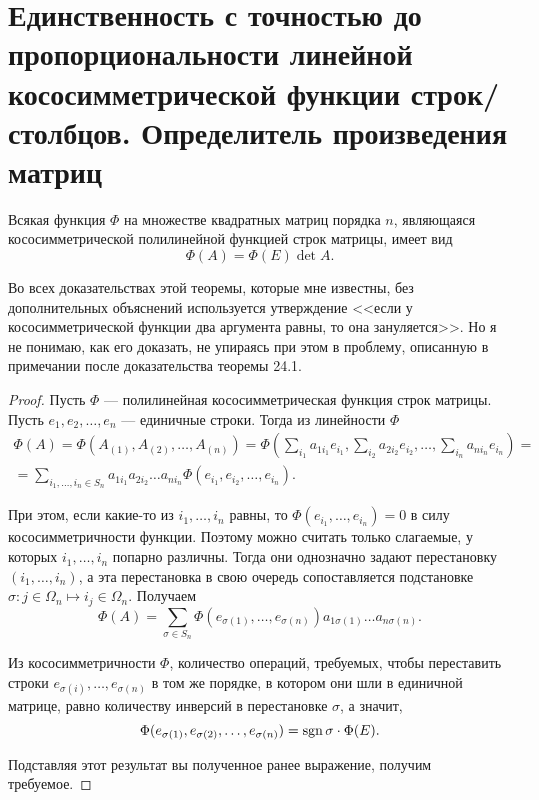 \section{Единственность с точностью до пропорциональности линейной кососимметрической функции строк/столбцов. Определитель произведения матриц}

\begin{theorem}
    Всякая функция $\Phi$ на множестве квадратных матриц порядка $n$, являющаяся кососимметрической полилинейной функцией строк матрицы, имеет вид
    $$
    \Phi(A) = \Phi(E) \det A.
    $$
\end{theorem}

\begin{remark}
    Во всех доказательствах этой теоремы, которые мне известны, без дополнительных объяснений используется утверждение <<если у кососимметрической функции два аргумента равны, то она зануляется>>. Но я не понимаю, как его доказать, не упираясь при этом в проблему, описанную в примечании после доказательства теоремы 24.1.
\end{remark}

\begin{proof}
    Пусть $\Phi$ --- полилинейная кососимметрическая функция строк матрицы. Пусть $e_1, e_2, \ldots, e_n$ --- единичные строки. Тогда из линейности $\Phi$
    $$
    \begin{array}{c}\displaystyle
        \Phi(A) = \Phi(A_{(1)}, A_{(2)}, \ldots, A_{(n)}) = \Phi\left(\sum_{i_1}a_{1 i_1}e_{i_1}, \sum_{i_2}a_{2 i_2}e_{i_2}, \ldots, \sum_{i_n}a_{n i_n}e_{i_n}\right) = {}\\\displaystyle{} = \sum_{i_1, \ldots, i_n \in S_n}a_{1 i_1} a_{2 i_2} \ldots a_{n i_n} \Phi(e_{i_1}, e_{i_2}, \ldots, e_{i_n}).
    \end{array}
    $$

    При этом, если какие-то из $i_1, \ldots, i_n$ равны, то $\Phi(e_{i_1}, \ldots, e_{i_n}) = 0$ в силу кососимметричности функции. Поэтому можно считать только слагаемые, у которых $i_1, \ldots, i_n$ попарно различны. Тогда они однозначно задают перестановку $(i_1, \ldots, i_n)$, а эта перестановка в свою очередь сопоставляется подстановке $\sigma: j \in \Omega_n \mapsto i_j \in \Omega_n$. Получаем
    $$
    \Phi(A) = \sum_{\sigma \in S_n} \Phi(e_{\sigma(1)}, \ldots, e_{\sigma(n)}) a_{1 \sigma(1)} \ldots a_{n \sigma(n)}.
    $$

    Из кососимметричности $\Phi$, количество операций, требуемых, чтобы переставить строки $e_{\sigma(i)}, \ldots, e_{\sigma(n)}$ в том же порядке, в котором они шли в единичной матрице, равно количеству инверсий в перестановке $\sigma$, а значит,
    $$
    \Phi(e_{\sigma(1)}, e_{\sigma(2)}, \ldots, e_{\sigma(n)}) = \mathrm{sgn}\,\sigma\cdot\Phi(E).
    $$

    Подставляя этот результат вы полученное ранее выражение, получим требуемое.
\end{proof}

